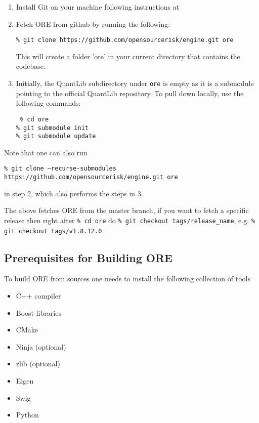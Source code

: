 \begin{enumerate}
\item Install Git on your machine following instructions at \cite{git-download}

\item Fetch ORE from github by running the following: 

{\tt\% git clone https://github.com/opensourcerisk/engine.git ore}      

This will create a folder 'ore' in your current directory that contains the codebase.

\item Initially, the QuantLib subdirectory under {\tt ore} is empty as it is a submodule pointing to the official
  QuantLib repository. To pull down locally, use the following commands:

{\tt
\% cd ore \\
\% git submodule init \\
\% git submodule update
}

\end{enumerate}

Note that one can also run 

{\footnotesize \tt\% git clone --recurse-submodules https://github.com/opensourcerisk/engine.git ore}

in step 2, which also performs the steps in 3.

The above fetches ORE from the master branch, if you want to fetch a specific release then right after {\tt\% cd ore} do {\tt\% git checkout tags/release\_name}, e.g. {\tt\% git checkout tags/v1.8.12.0}. 

\subsection{Prerequisites for Building ORE}
\label{sec:prerequisites}

To build ORE from sources one needs to install the following collection of tools
\begin{itemize}
\item C++ compiler
\item Boost libraries
\item CMake
\item Ninja (optional)
\item zlib (optional)
\item Eigen 
\item Swig
\item Python
\end{itemize}

